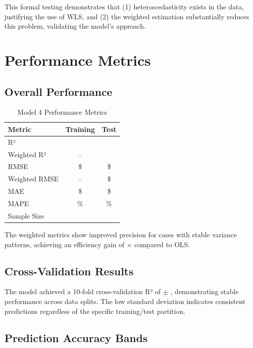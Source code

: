This formal testing demonstrates that (1) heteroscedasticity exists in the data, justifying the use of WLS, and (2) the weighted estimation substantially reduces this problem, validating the model's approach.

\section{Performance Metrics}

\subsection{Overall Performance}

\begin{table}[h]
\centering
\caption{Model 4 Performance Metrics}
\begin{tabular}{lcc}
\toprule
\textbf{Metric} & \textbf{Training} & \textbf{Test} \\
\midrule
R² & \ModelFourRSquaredTrain{} & \ModelFourRSquaredTest{} \\
Weighted R² & -- & \ModelFourWeightedRSquared{} \\
RMSE & \$\ModelFourRMSETrain{} & \$\ModelFourRMSETest{} \\
Weighted RMSE & -- & \$\ModelFourWeightedRMSE{} \\
MAE & \$\ModelFourMAETrain{} & \$\ModelFourMAETest{} \\
MAPE & \ModelFourMAPETrain{}\% & \ModelFourMAPETest{}\% \\
Sample Size & \ModelFourTrainingSamples{} & \ModelFourTestSamples{} \\
\bottomrule
\end{tabular}
\end{table}

The weighted metrics show improved precision for cases with stable variance patterns, achieving an efficiency gain of \ModelFourEfficiencyRatio{}$\times$ compared to OLS.

\subsection{Cross-Validation Results}

The model achieved a 10-fold cross-validation R² of \ModelFourCVMean{} $\pm$ \ModelFourCVStd{}, demonstrating stable performance across data splits. The low standard deviation indicates consistent predictions regardless of the specific training/test partition.

\subsection{Prediction Accuracy Bands}


